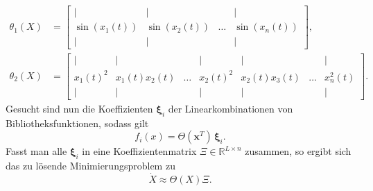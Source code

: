 \begin{align}
\theta_1(X) &= \begin{bmatrix}
		\mid 	  & \mid     		  &          & \mid             \\
		\sin(x_1(t)) & \sin(x_2(t))   & \dots    & \sin(x_n(t)) \\
		\mid      & \mid     		  &          & \mid              
	\end{bmatrix},\\
\theta_2(X) &= \begin{bmatrix}
		\mid & \mid & & \mid & \mid & & \mid \\
		x_1(t)^2 & x_1(t)x_2(t) & \dots & x_2(t)^2 & x_2(t)x_3(t) & \dots & x_n^2(t) \\
		\mid & \mid & & \mid & \mid & & \mid
	\end{bmatrix}.
\end{align}
Gesucht sind nun die Koeffizienten $\boldsymbol{\xi}_i$ der Linearkombinationen von Bibliotheksfunktionen, sodass gilt
\begin{equation}
f_i(x) = \Theta(\boldsymbol{x}^T)\,\boldsymbol{\xi}_i.
\end{equation}
Fasst man alle $\boldsymbol{\xi}_i$ in eine Koeffizientenmatrix $\Xi\in\mathbb{R}^{L\times n}$ zusammen, so ergibt sich das zu lösende Minimierungsproblem zu 
\begin{equation}
\dot{X} \approx \Theta(X)\Xi. \label{eq:Minimierungsproblem}
\end{equation}

